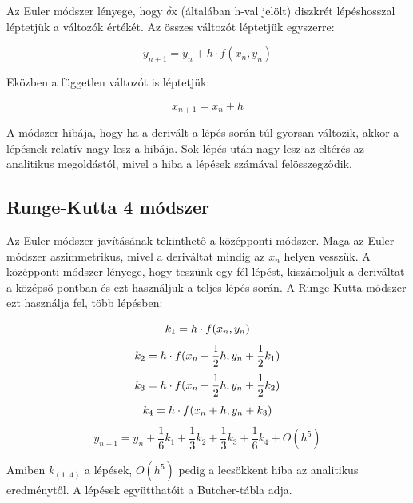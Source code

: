 \documentclass[a4paper, 12pt]{article}
\begin{document}
Az Euler módszer lényege, hogy $\delta$x (általában h-val jelölt) diszkrét lépéshosszal léptetjük a változók értékét. Az összes változót léptetjük egyszerre:
\begin{center}
\begin{equation}
y_{n+1}=y_n+h\cdot f(x_n,y_n)
\end{equation}
\end{center}
Eközben a független változót is léptetjük:
\begin{center}
\begin{equation}
x_{n+1}=x_n+h
\end{equation}
\end{center}
A módszer hibája, hogy ha a derivált a lépés során túl gyorsan változik, akkor a lépésnek relatív nagy lesz a hibája. Sok lépés után nagy lesz az eltérés az analitikus megoldástól, mivel a hiba a lépések számával felösszegződik.

\subsection{Runge-Kutta 4 módszer}
\label{subsec:rk4_1}

Az Euler módszer javításának tekinthető a középponti módszer. Maga az Euler módszer aszimmetrikus, mivel a deriváltat mindig az $x_n$ helyen vesszük. A középponti módszer lényege, hogy teszünk egy fél lépést, kiszámoljuk a deriváltat a középső pontban és ezt használjuk a teljes lépés során. A Runge-Kutta módszer ezt használja fel, több lépésben:
\begin{center}
\begin{equation}
k_1=h\cdot f(x_n,y_n)\newline
\end{equation}
\begin{equation}
k_2=h\cdot f(x_n+\frac{1}{2}h,y_n+\frac{1}{2}k_1)\newline
\end{equation}
\begin{equation}
k_3=h\cdot f(x_n+\frac{1}{2}h,y_n+\frac{1}{2}k_2)\newline
\end{equation}
\begin{equation}
k_4=h\cdot f(x_n+h,y_n+k_3)\newline
\end{equation}
\begin{equation}
y_{n+1}=y_n+\frac{1}{6}k_1+\frac{1}{3}k_2+\frac{1}{3}k_3+\frac{1}{6}k_4+O(h^5)
\end{equation}
\end{center}
Amiben $k_{(1..4)}$ a lépések, $O(h^5)$ pedig a lecsökkent hiba az analitikus eredménytől. A lépések együtthatóit a Butcher-tábla adja.
\end{document}
